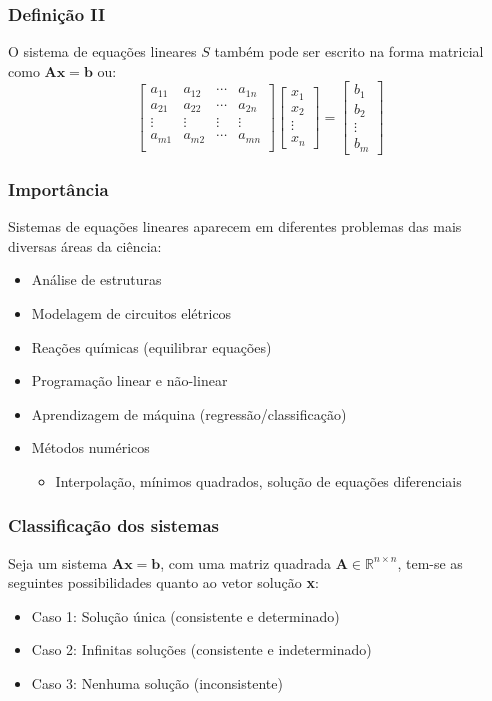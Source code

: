 \documentclass{beamer}
\theoremstyle{mystyle}
\begin{document}
\begin{frame}
	\frametitle{Definição II}
	O sistema de equações lineares $ S $ também pode ser escrito na forma matricial como $ \mathbf{Ax} = \mathbf{b}$ ou:
	\begin{equation*}
		\left[
		\begin{array}{cccc}
			a_{11} & a_{12} & \cdots & a_{1n} \\
			a_{21} & a_{22} & \cdots & a_{2n} \\
			\vdots & \vdots & \vdots & \vdots \\
			a_{m1} & a_{m2} & \cdots & a_{mn}\\
		\end{array}
		\right] 
		\begin{bmatrix} x_{1} \\ x_{2} \\ \vdots \\ x_{n} \end{bmatrix}
		=
		\begin{bmatrix} b_{1} \\ b_{2} \\ \vdots \\ b_{m} \end{bmatrix}
	\end{equation*}
\end{frame}

\begin{frame}
	\frametitle{Importância}
	Sistemas de equações lineares aparecem em diferentes problemas das mais diversas áreas da ciência:
	\begin{itemize}
		\item Análise de estruturas
		\item Modelagem de circuitos elétricos
		\item Reações químicas (equilibrar equações)
		\item Programação linear e não-linear
		\item Aprendizagem de máquina (regressão/classificação)
		\item Métodos numéricos
		\begin{itemize}
			\item Interpolação, mínimos quadrados, solução de equações diferenciais
		\end{itemize}
	\end{itemize}
\end{frame}

\begin{frame}
	\frametitle{Classificação dos sistemas}
	Seja um sistema $ \mathbf{Ax} = \mathbf{b}$, com uma matriz quadrada $ \mathbf{A} \in \mathbb{R}^{n\times n} $, tem-se as seguintes possibilidades quanto ao vetor solução \textbf{x}:
	\begin{itemize}
		\item Caso 1: Solução única (consistente e determinado)
		\item Caso 2: Infinitas soluções (consistente e indeterminado)
		\item Caso 3: Nenhuma solução (inconsistente)
	\end{itemize}
\end{frame}
\end{document}
